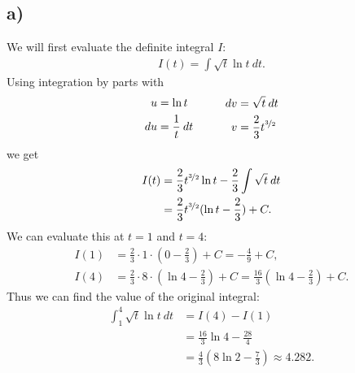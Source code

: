 \documentclass{article}
\begin{document}
\subsection*{a)}
We will first evaluate the definite integral $I$:
\begin{align*}
	I(t)=\int \sqrt{t}\ln t\: dt.
\end{align*}
Using integration by parts with
\begin{align*}
	\begin{aligned}
		u  & = \ln t           \\
		du & = \frac{1}{t}\:dt
	\end{aligned}
	\hspace{1cm}
	\begin{aligned}
		dv & = \sqrt{t}\:dt                   \\
		v  & = \frac{2}{3}t^{\nicefrac{3}{2}}
	\end{aligned}
\end{align*}
we get
\begin{align*}
	I(t) & =\frac{2}{3}t^{\nicefrac{3}{2}}\ln t - \frac{2}{3}\int \sqrt{t}\:dt \\
	     & =\frac{2}{3}t^{\nicefrac{3}{2}}(\ln t - \frac{2}{3}) + C.
\end{align*}
We can evaluate this at $t=1$ and $t=4$:
\begin{align*}
	I(1) & =\frac{2}{3}\cdot 1\cdot (0-\frac{2}{3})+C=-\frac{4}{9}+C,                           \\
	I(4) & =\frac{2}{3}\cdot 8\cdot(\ln 4 - \frac{2}{3})+C=\frac{16}{3}(\ln 4 - \frac{2}{3})+C.
\end{align*}
Thus we can find the value of the original integral:
\begin{align*}
	\int_1^4 \sqrt{t}\ln t\:dt & = I(4)-I(1)                                       \\
	                           & =\frac{16}{3}\ln 4 - \frac{28}{4}                 \\
	                           & = \frac{4}{3}(8\ln 2 - \frac{7}{3})\approx 4.282.
\end{align*}
\end{document}

